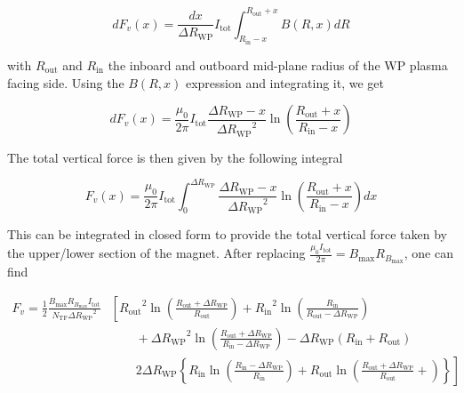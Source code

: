\documentclass[hidelinks]{article}
\numberwithin{equation}{section}
\begin{document}
    \begin{equation}
        dF_v(x) = \frac{dx}{\Delta R_\mathrm{WP}} I_\mathrm{tot} \int_{R_\mathrm{in}-x}^{R_\mathrm{out}+x} B(R,x) dR
    \end{equation}
    
    \noi with $R_\mathrm{out}$ and $R_\mathrm{in}$ the inboard and outboard mid-plane radius of 
    the WP plasma facing side. Using the $B(R,x)$ expression and integrating it, we get 
    
    \begin{equation}
        dF_v (x)= \frac{\mu_0}{2\pi} I_\mathrm{tot} \frac{\Delta R_\mathrm{WP}-x}{{\Delta R_\mathrm{WP}}^2} \ln(\frac{R_\mathrm{out}+x}{R_\mathrm{in}-x})
    \end{equation}

    \noi The total vertical force is then given by the following integral

    
    \begin{equation}
        F_v (x)=\frac{\mu_0}{2\pi} I_\mathrm{tot} \int_{0}^{\Delta R_\mathrm{WP}} \frac{\Delta R_\mathrm{WP}-x}{{\Delta R_\mathrm{WP}}^2}
           \ln(\frac{R_\mathrm{out}+x}{R_\mathrm{in}-x}) dx
    \end{equation}
  
    \noi This can be integrated in closed form to provide the total vertical force taken by the 
    upper/lower section of the magnet. After replacing $\frac{\mu_0 I_\mathrm{tot}}{2\pi}=B_\mathrm{max} 
    R_{B_\mathrm{max}}$, one can find
 
    \begin{align}\label{eq: vforce}
        F_v = \frac{1}{2} \frac{B_\text{max}R_{B_\mathrm{max}} I_\mathrm{tot}}{N_\mathrm{TF} {\Delta R_\mathrm{WP}}^2 }   & \left[{R_\mathrm{out}}^2 \ln\left(   \frac{R_\mathrm{out} + \Delta R_\mathrm{WP}}{R_\mathrm{out}} \right)  + {R_\mathrm{in}}^2 \ln\left( \frac{R_\mathrm{in} }{R_\mathrm{out} - \Delta R_\mathrm{WP}} \right) \right.  \\
        & \qquad \left. {} + {\Delta R_\mathrm{WP}}^2 \ln\left( \frac{R_\mathrm{out} + \Delta R_\mathrm{WP} }{R_\mathrm{in} - \Delta R_\mathrm{WP}} \right)  - \Delta R_\mathrm{WP}\left( R_\mathrm{in} + R_\mathrm{out} \right)   \right.\nonumber \\
        & \qquad \left. {}  2\Delta R_\mathrm{WP} \left\{ R_\mathrm{in}\ln\left(\frac{R_\mathrm{in}-\Delta R_\mathrm{WP}}{R_\mathrm{in}} \right) + R_\mathrm{out}\ln\left(\frac{R_\mathrm{out}+ \Delta R_\mathrm{WP}}{R_\mathrm{out}} + \right)   \right\}  \right] \nonumber
    \end{align}
\end{document}
